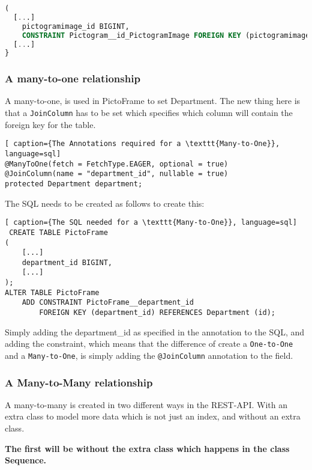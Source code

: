 \begin{lstlisting}[caption={The SQL to create the required}, language=sql]
(
  [...]
    pictogramimage_id BIGINT,
    CONSTRAINT Pictogram__id_PictogramImage FOREIGN KEY (pictogramimage_id) REFERENCES PictogramImage (id),
  [...]
}
\end{lstlisting}


\subsubsection*{A many-to-one relationship}

A many-to-one, is used in PictoFrame to set Department.
The new thing here is that a \texttt{JoinColumn} has to be set which specifies which column will contain the foreign key for the table.


\begin{lstlisting}[ caption={The Annotations required for a \texttt{Many-to-One}}, language=sql]
@ManyToOne(fetch = FetchType.EAGER, optional = true)
@JoinColumn(name = "department_id", nullable = true) 
protected Department department;
\end{lstlisting}

The SQL needs to be created as follows to create this:

\begin{lstlisting}[ caption={The SQL needed for a \texttt{Many-to-One}}, language=sql]
 CREATE TABLE PictoFrame
(
    [...]
    department_id BIGINT,
    [...]
);
ALTER TABLE PictoFrame
    ADD CONSTRAINT PictoFrame__department_id
        FOREIGN KEY (department_id) REFERENCES Department (id);
\end{lstlisting}

Simply adding the department\_id as specified in the annotation to the SQL, and adding the constraint, which means that the difference of create a \texttt{One-to-One} and a \texttt{Many-to-One}, is simply adding the \texttt{@JoinColumn} annotation to the field.

\subsubsection*{A Many-to-Many relationship}

A many-to-many is created in two different ways in the REST-API.
With an extra class to model more data which is not just an index, and without an extra class.

\textbf{The first will be without the extra class which happens in the class Sequence.}

